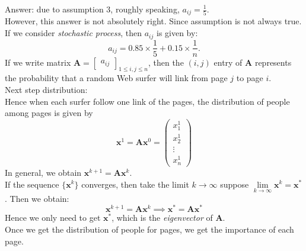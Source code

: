 Answer: due to assumption 3, roughly speaking, $a_{ij}=\frac{1}{5}$.\\
However, this answer is not absolutely right. Since assumption is not always true. If we consider \textit{stochastic process}, then $a_{ij}$ is given by:
\[
a_{ij}=0.85\times\frac{1}{5}+0.15\times\frac{1}{n}.
\]
If we write matrix $\bm A=\begin{bmatrix}
a_{ij}
\end{bmatrix}_{1\le i,j\le n}$, then the $(i,j)$ entry of $\bm A$ represents the probability that a random Web surfer will link from page $j$ to page $i$.
\\
Next step distribution:\\
Hence when each surfer follow one link of the pages, the distribution of people among pages is given by
\[
\bm x^1=\bm A\bm x^0=\begin{pmatrix}
x_1^1\\x_2^1\\\vdots\\x_n^1
\end{pmatrix}
\]
In general, we obtain $\bm x^{k+1}=\bm A\bm x^{k}$.\\
If the sequence $\{\bm x^k\}$ converges, then take the limit $k\rightarrow\infty$ suppose $\lim\limits_{k\rightarrow\infty}\bm x^k=\bm x^*$. Then we obtain:
\[
\bm x^{k+1}=\bm A\bm x^{k}
\implies
\bm x^*=\bm A\bm x^*
\]
Hence we only need to get $\bm x^*$, which is the \textit{eigenvector} of $\bm A$.\\
Once we get the distribution of people for pages, we get the importance of each page.